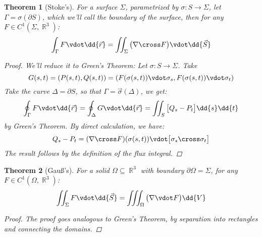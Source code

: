 \documentclass[12pt]{article}
\renewcommand{\div}{\nabla\vdot}
\renewcommand{\curl}{\nabla\cross}
\DeclareMathOperator{\R}{\mathbb{R}}
\newtheorem{theorem}{Theorem}[subsection]
\begin{document}
\begin{theorem}[Stoke's]
  For a surface $\Sigma$, parametrized by $\sigma:S\to\Sigma$, let $\Gamma=\sigma(\partial S)$, which we'll call the boundary of the surface, then for any $F\in C^1(\Sigma,\R^3)$: $$\int_{\Gamma}F\vdot\dd{\vec{r}}=\iint_{\Sigma}\big(\curl F\big)\vdot\dd{\vec{S}}$$
  \begin{proof}
    We'll reduce it to Green's Theorem: Let $\sigma:S\to\Sigma$. Take $$G(s,t)=(P(s,t),Q(s,t))=(F(\sigma(s,t))\vdot\sigma_s,F(\sigma(s,t))\vdot\sigma_t)$$ Take the curve $\Delta=\partial S$, so that $\Gamma=\vec{\sigma}(\Delta)$, we get: $$\oint_\Gamma F\vdot\dd{\vec{r}}=\oint_\Delta G\vdot\dd{\vec{r}}=\iint_{S}\big[Q_s-P_t\big]\dd{s}\dd{t}$$
    by Green's Theorem. By direct calculation, we have: $$Q_s-P_t=(\curl F)(\sigma(s,t))\vdot\big[\sigma_s\cross\sigma_t\big]$$
    The result follows by the definition of the flux integral.
  \end{proof}
\end{theorem}

\begin{theorem}[Gauß's]
  For a solid $\Omega\subseteq\R^3$ with boundary $\partial\Omega=\Sigma$, for any $F\in C^1(\Omega,\R^3)$: $$\iint_{\Sigma}F\vdot\dd{\vec{S}}=\iiint_{\Omega}\big(\div F\big)\dd{V}$$
  \begin{proof}
    The proof goes analogous to Green's Theorem, by separation into rectangles and connecting the domains.
  \end{proof}
\end{theorem}
\end{document}
